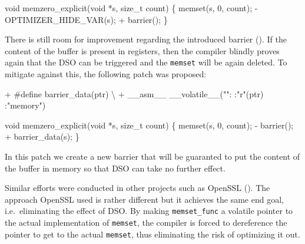 \documentclass[
  a4paper,
]{report}
\newenvironment{Shaded}{}{}
\newcommand{\DataTypeTok}[1]{\textcolor[rgb]{0.56,0.13,0.00}{#1}}
\newcommand{\DecValTok}[1]{\textcolor[rgb]{0.25,0.63,0.44}{#1}}
\newcommand{\NormalTok}[1]{#1}
\newcommand{\OperatorTok}[1]{\textcolor[rgb]{0.40,0.40,0.40}{#1}}
\newcommand{\StringTok}[1]{\textcolor[rgb]{0.25,0.44,0.63}{#1}}
\begin{document}
\begin{Shaded}
\begin{Highlighting}[]
\DataTypeTok{void}\NormalTok{ memzero\_explicit}\OperatorTok{(}\DataTypeTok{void} \OperatorTok{*}\NormalTok{s}\OperatorTok{,} \DataTypeTok{size\_t}\NormalTok{ count}\OperatorTok{)}
\OperatorTok{\{}
\NormalTok{  memset}\OperatorTok{(}\NormalTok{s}\OperatorTok{,} \DecValTok{0}\OperatorTok{,}\NormalTok{ count}\OperatorTok{);}
  \OperatorTok{{-}}\NormalTok{ OPTIMIZER\_HIDE\_VAR}\OperatorTok{(}\NormalTok{s}\OperatorTok{);}
  \OperatorTok{+}\NormalTok{ barrier}\OperatorTok{();}
\OperatorTok{\}}
\end{Highlighting}
\end{Shaded}

There is still room for improvement regarding the introduced barrier
(). If the content of the
buffer is present in registers, then the compiler blindly proves again
that the DSO can be triggered and the \texttt{memset} will be again
deleted. To mitigate against this, the following patch was proposed:

\begin{Shaded}
\begin{Highlighting}[]
\OperatorTok{+}\NormalTok{ \#define barrier\_data}\OperatorTok{(}\NormalTok{ptr}\OperatorTok{)}\NormalTok{ \textbackslash{}}
\OperatorTok{+}\NormalTok{  \_\_asm\_\_ \_\_volatile\_\_}\OperatorTok{(}\StringTok{""}\OperatorTok{:} \OperatorTok{:}\StringTok{"r"}\OperatorTok{(}\NormalTok{ptr}\OperatorTok{)} \OperatorTok{:}\StringTok{"memory"}\OperatorTok{)}

\DataTypeTok{void}\NormalTok{ memzero\_explicit}\OperatorTok{(}\DataTypeTok{void} \OperatorTok{*}\NormalTok{s}\OperatorTok{,} \DataTypeTok{size\_t}\NormalTok{ count}\OperatorTok{)}
\OperatorTok{\{}
\NormalTok{  memset}\OperatorTok{(}\NormalTok{s}\OperatorTok{,} \DecValTok{0}\OperatorTok{,}\NormalTok{ count}\OperatorTok{);}
  \OperatorTok{{-}}\NormalTok{ barrier}\OperatorTok{();}
  \OperatorTok{+}\NormalTok{ barrier\_data}\OperatorTok{(}\NormalTok{s}\OperatorTok{);}
\OperatorTok{\}}
\end{Highlighting}
\end{Shaded}

In this patch we create a new barrier that will be guaranted to put the
content of the buffer in memory so that DSO can take no further effect.

Similar efforts were conducted in other projects such as OpenSSL
(). The approach OpenSSL used is
rather different but it achieves the same end goal, i.e.~eliminating the
effect of DSO. By making \texttt{memset\_func} a volatile pointer to the
actual implementation of \texttt{memset}, the compiler is forced to
dereference the pointer to get to the actual \texttt{memset}, thus
eliminating the risk of optimizing it out.
\end{document}
